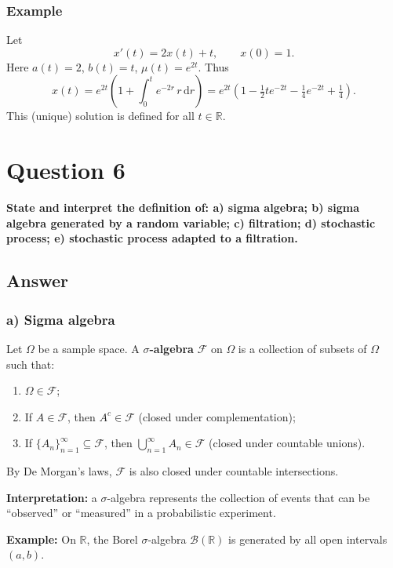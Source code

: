 \documentclass[12pt,a4paper]{book}
\theoremstyle{remark}
\newcommand{\RR}{\mathbb{R}}
\newcommand{\F}{\mathcal{F}}          %
\newcommand{\dd}{\mathrm{d}}
\begin{document}
\subsubsection*{Example}
Let
\[
x'(t)=2x(t)+t,\qquad x(0)=1.
\]
Here $a(t)=2$, $b(t)=t$, $\mu(t)=e^{2t}$. Thus
\[
x(t)=e^{2t}\left(1+\int_0^t e^{-2r}\,r\,\dd r\right)
= e^{2t}\left(1-\tfrac12 t e^{-2t}-\tfrac14 e^{-2t}+\tfrac14\right).
\]
This (unique) solution is defined for all $t\in\RR$.













\newpage
\section{Question 6}
\textbf{State and interpret the definition of:  
a) sigma algebra;  
b) sigma algebra generated by a random variable;  
c) filtration;  
d) stochastic process;  
e) stochastic process adapted to a filtration.}

\subsection*{Answer}

\subsubsection*{a) Sigma algebra}
Let $\Omega$ be a sample space. A \textbf{$\sigma$-algebra} $\F$ on $\Omega$ is a collection of subsets of $\Omega$ such that:
\begin{enumerate}[label=\roman*)]
    \item $\Omega \in \F$;
    \item If $A \in \F$, then $A^c \in \F$ (closed under complementation);
    \item If $\{A_n\}_{n=1}^\infty \subseteq \F$, then $\bigcup_{n=1}^\infty A_n \in \F$ (closed under countable unions).
\end{enumerate}
By De Morgan’s laws, $\F$ is also closed under countable intersections.  

\textbf{Interpretation:} a $\sigma$-algebra represents the collection of events that can be “observed” or “measured” in a probabilistic experiment.  

\textbf{Example:} On $\RR$, the Borel $\sigma$-algebra $\mathcal{B}(\RR)$ is generated by all open intervals $(a,b)$.
\end{document}
